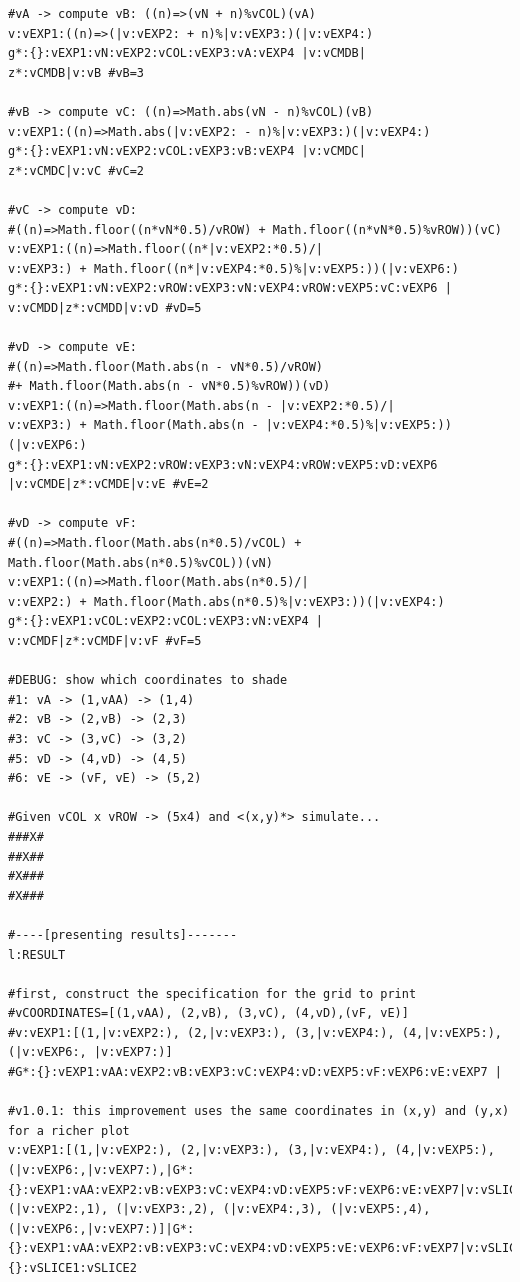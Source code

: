 \documentclass[a4paper, 18pt]{book} %
\begin{document}
\begin{tcolorbox}[teaterminalstyle, title=TEA Program: N-SIGIL image generator program, breakable]
\begin{lstlisting}[language=TEA,breaklines=true]
#vA -> compute vB: ((n)=>(vN + n)%vCOL)(vA)
v:vEXP1:((n)=>(|v:vEXP2: + n)%|v:vEXP3:)(|v:vEXP4:)
g*:{}:vEXP1:vN:vEXP2:vCOL:vEXP3:vA:vEXP4 |v:vCMDB|
z*:vCMDB|v:vB #vB=3

#vB -> compute vC: ((n)=>Math.abs(vN - n)%vCOL)(vB)
v:vEXP1:((n)=>Math.abs(|v:vEXP2: - n)%|v:vEXP3:)(|v:vEXP4:)
g*:{}:vEXP1:vN:vEXP2:vCOL:vEXP3:vB:vEXP4 |v:vCMDC|
z*:vCMDC|v:vC #vC=2

#vC -> compute vD: 
#((n)=>Math.floor((n*vN*0.5)/vROW) + Math.floor((n*vN*0.5)%vROW))(vC)
v:vEXP1:((n)=>Math.floor((n*|v:vEXP2:*0.5)/|
v:vEXP3:) + Math.floor((n*|v:vEXP4:*0.5)%|v:vEXP5:))(|v:vEXP6:)
g*:{}:vEXP1:vN:vEXP2:vROW:vEXP3:vN:vEXP4:vROW:vEXP5:vC:vEXP6 |
v:vCMDD|z*:vCMDD|v:vD #vD=5

#vD -> compute vE: 
#((n)=>Math.floor(Math.abs(n - vN*0.5)/vROW) 
#+ Math.floor(Math.abs(n - vN*0.5)%vROW))(vD)
v:vEXP1:((n)=>Math.floor(Math.abs(n - |v:vEXP2:*0.5)/|
v:vEXP3:) + Math.floor(Math.abs(n - |v:vEXP4:*0.5)%|v:vEXP5:))(|v:vEXP6:)
g*:{}:vEXP1:vN:vEXP2:vROW:vEXP3:vN:vEXP4:vROW:vEXP5:vD:vEXP6 
|v:vCMDE|z*:vCMDE|v:vE #vE=2

#vD -> compute vF: 
#((n)=>Math.floor(Math.abs(n*0.5)/vCOL) + Math.floor(Math.abs(n*0.5)%vCOL))(vN)
v:vEXP1:((n)=>Math.floor(Math.abs(n*0.5)/|
v:vEXP2:) + Math.floor(Math.abs(n*0.5)%|v:vEXP3:))(|v:vEXP4:)
g*:{}:vEXP1:vCOL:vEXP2:vCOL:vEXP3:vN:vEXP4 |
v:vCMDF|z*:vCMDF|v:vF #vF=5

#DEBUG: show which coordinates to shade
#1: vA -> (1,vAA) -> (1,4)
#2: vB -> (2,vB) -> (2,3)
#3: vC -> (3,vC) -> (3,2)
#5: vD -> (4,vD) -> (4,5)
#6: vE -> (vF, vE) -> (5,2)

#Given vCOL x vROW -> (5x4) and <(x,y)*> simulate...
###X#
##X##
#X###
#X###

#----[presenting results]-------
l:RESULT

#first, construct the specification for the grid to print
#vCOORDINATES=[(1,vAA), (2,vB), (3,vC), (4,vD),(vF, vE)]
#v:vEXP1:[(1,|v:vEXP2:), (2,|v:vEXP3:), (3,|v:vEXP4:), (4,|v:vEXP5:),(|v:vEXP6:, |v:vEXP7:)]
#G*:{}:vEXP1:vAA:vEXP2:vB:vEXP3:vC:vEXP4:vD:vEXP5:vF:vEXP6:vE:vEXP7 | 

#v1.0.1: this improvement uses the same coordinates in (x,y) and (y,x) for a richer plot
v:vEXP1:[(1,|v:vEXP2:), (2,|v:vEXP3:), (3,|v:vEXP4:), (4,|v:vEXP5:),(|v:vEXP6:,|v:vEXP7:),|G*:{}:vEXP1:vAA:vEXP2:vB:vEXP3:vC:vEXP4:vD:vEXP5:vF:vEXP6:vE:vEXP7|v:vSLICE1|v:vEXP1:(|v:vEXP2:,1), (|v:vEXP3:,2), (|v:vEXP4:,3), (|v:vEXP5:,4),(|v:vEXP6:,|v:vEXP7:)]|G*:{}:vEXP1:vAA:vEXP2:vB:vEXP3:vC:vEXP4:vD:vEXP5:vE:vEXP6:vF:vEXP7|v:vSLICE2|G*:{}:vSLICE1:vSLICE2


\end{lstlisting}
\end{tcolorbox}
\end{document}
